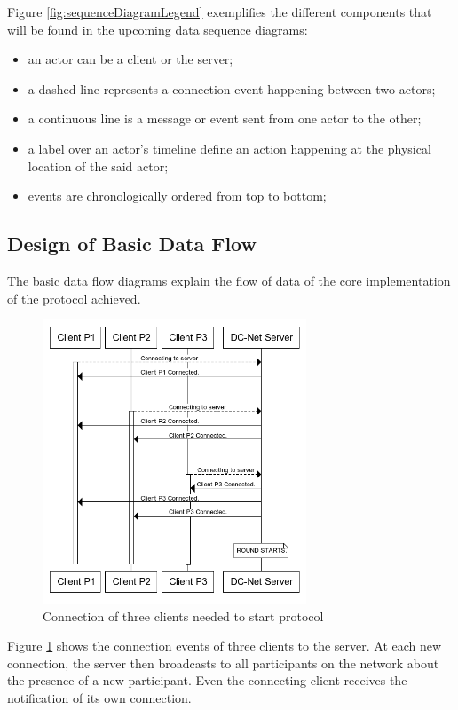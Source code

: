 Figure \ref{fig:sequenceDiagramLegend} exemplifies the different components that will be found in the upcoming data sequence diagrams: 
\begin{itemize}
    \item an actor can be a client or the server;
    \item a dashed line represents a connection event happening between two actors;
    \item a continuous line is a message or event sent from one actor to the other;
    \item a label over an actor's timeline define an action happening at the physical location of the said actor;
    \item events are chronologically ordered from top to bottom;
\end{itemize}

\subsection{Design of Basic Data Flow}
The basic data flow diagrams explain the flow of data of the core implementation of the protocol achieved.


\begin{figure}[H]
    \centering
    \includegraphics[width=0.7\textwidth]{Images/Design/clientsConnection.png}
    \caption{Connection of three clients needed to start protocol}
    \label{fig:clientsConnection}
\end{figure}


Figure \ref{fig:clientsConnection} shows the connection events of three clients to the server. At each new connection, the server then broadcasts to all participants on the network about the presence of a new participant. Even the connecting client receives the notification of its own connection.

